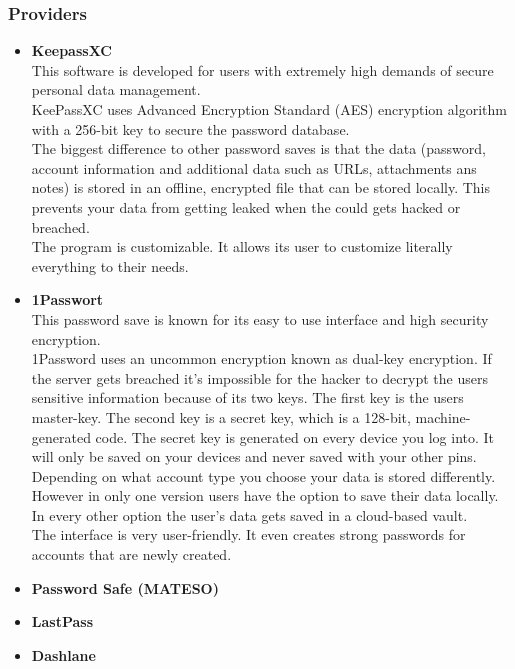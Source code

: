 \documentclass[10pt,a4paper,titlepage]{paper}
\begin{document}
\subsubsection{Providers}
\begin{itemize}
\item \textbf{KeepassXC}\\
This software is developed for users with extremely high demands of secure personal data management. \\
KeePassXC uses Advanced Encryption Standard (AES) encryption algorithm with a 256-bit key to secure the password database.\\
The biggest difference to other password saves is that the data (password, account information and additional data such as URLs, attachments ans notes) is stored in an offline, encrypted file that can be stored locally. This prevents your data from getting leaked when the could gets hacked or breached.\\
The program is customizable. It allows its user to customize literally everything to their needs.\\

\item \textbf{1Passwort}\\
This password save is known for its easy to use interface and high security encryption.\\
1Password uses an uncommon encryption known as dual-key encryption. If the server gets breached it's impossible for the hacker to decrypt the users sensitive information because of its two keys. The first key is the users master-key. The second key is a secret key, which is a 128-bit, machine-generated code. The secret key is generated on every device you log into. It will only be saved on your devices and never saved with your other pins.\\
Depending on what account type you choose your data is stored differently. However in only one version users have the option to save their data locally. In every other option the user's data gets saved in a cloud-based vault.\\
The interface is very user-friendly. It even creates strong passwords for accounts that are newly created.
\item \textbf{Password Safe (MATESO)}\\

\item \textbf{LastPass}\\
\item \textbf{Dashlane}\\
\end{itemize}
\end{document}
